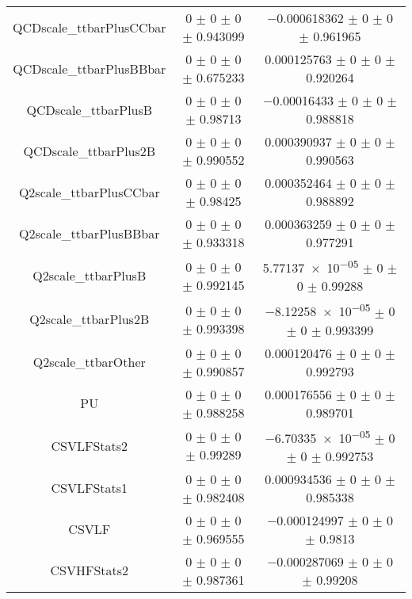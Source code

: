 \begin{table}
\begin{tabular}{ccc}
QCDscale\_ttbarPlusCCbar 	& \num{0} $\pm$ \num{0} $\pm$ \num{0} $\pm$ \num{0.943099} 	& \num{-0.000618362} $\pm$ \num{0} $\pm$ \num{0} $\pm$ \num{0.961965}\\
QCDscale\_ttbarPlusBBbar 	& \num{0} $\pm$ \num{0} $\pm$ \num{0} $\pm$ \num{0.675233} 	& \num{0.000125763} $\pm$ \num{0} $\pm$ \num{0} $\pm$ \num{0.920264}\\
QCDscale\_ttbarPlusB 	& \num{0} $\pm$ \num{0} $\pm$ \num{0} $\pm$ \num{0.98713} 	& \num{-0.00016433} $\pm$ \num{0} $\pm$ \num{0} $\pm$ \num{0.988818}\\
QCDscale\_ttbarPlus2B 	& \num{0} $\pm$ \num{0} $\pm$ \num{0} $\pm$ \num{0.990552} 	& \num{0.000390937} $\pm$ \num{0} $\pm$ \num{0} $\pm$ \num{0.990563}\\
Q2scale\_ttbarPlusCCbar 	& \num{0} $\pm$ \num{0} $\pm$ \num{0} $\pm$ \num{0.98425} 	& \num{0.000352464} $\pm$ \num{0} $\pm$ \num{0} $\pm$ \num{0.988892}\\
Q2scale\_ttbarPlusBBbar 	& \num{0} $\pm$ \num{0} $\pm$ \num{0} $\pm$ \num{0.933318} 	& \num{0.000363259} $\pm$ \num{0} $\pm$ \num{0} $\pm$ \num{0.977291}\\
Q2scale\_ttbarPlusB 	& \num{0} $\pm$ \num{0} $\pm$ \num{0} $\pm$ \num{0.992145} 	& \num{5.77137e-05} $\pm$ \num{0} $\pm$ \num{0} $\pm$ \num{0.99288}\\
Q2scale\_ttbarPlus2B 	& \num{0} $\pm$ \num{0} $\pm$ \num{0} $\pm$ \num{0.993398} 	& \num{-8.12258e-05} $\pm$ \num{0} $\pm$ \num{0} $\pm$ \num{0.993399}\\
Q2scale\_ttbarOther 	& \num{0} $\pm$ \num{0} $\pm$ \num{0} $\pm$ \num{0.990857} 	& \num{0.000120476} $\pm$ \num{0} $\pm$ \num{0} $\pm$ \num{0.992793}\\
PU 	& \num{0} $\pm$ \num{0} $\pm$ \num{0} $\pm$ \num{0.988258} 	& \num{0.000176556} $\pm$ \num{0} $\pm$ \num{0} $\pm$ \num{0.989701}\\
CSVLFStats2 	& \num{0} $\pm$ \num{0} $\pm$ \num{0} $\pm$ \num{0.99289} 	& \num{-6.70335e-05} $\pm$ \num{0} $\pm$ \num{0} $\pm$ \num{0.992753}\\
CSVLFStats1 	& \num{0} $\pm$ \num{0} $\pm$ \num{0} $\pm$ \num{0.982408} 	& \num{0.000934536} $\pm$ \num{0} $\pm$ \num{0} $\pm$ \num{0.985338}\\
CSVLF 	& \num{0} $\pm$ \num{0} $\pm$ \num{0} $\pm$ \num{0.969555} 	& \num{-0.000124997} $\pm$ \num{0} $\pm$ \num{0} $\pm$ \num{0.9813}\\
CSVHFStats2 	& \num{0} $\pm$ \num{0} $\pm$ \num{0} $\pm$ \num{0.987361} 	& \num{-0.000287069} $\pm$ \num{0} $\pm$ \num{0} $\pm$ \num{0.99208}\\

\end{tabular}
\end{table}
